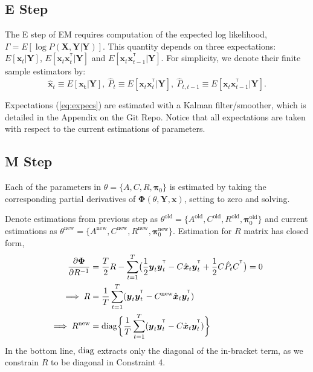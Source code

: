 \documentclass[fleqn,12pt]{article}
\let\oldref\ref
\renewcommand{\ref}[1]{(\oldref{#1})}
\newcommand{\T}{^{\ensuremath{\mathsf{T}}}}           %
\newcommand{\diag}{\operatornamewithlimits{diag}}
\providecommand{\mb}[1]{\boldsymbol{#1}}
\newcommand{\bx}{\mb{x}}
\newcommand{\by}{\mb{y}}
\newcommand{\bX}{\mb{X}}
\newcommand{\bY}{\mb{Y}}
\begin{document}
\subsection{E Step}
The E step of EM requires computation of the expected log likelihood, $\Gamma = E[\log P(\bX,\bY|\bY)]$. This quantity depends on three expectations: $E[\bx_t|\bY]$, $E[\bx_t\bx_t^{\T}|\bY]$ and $E[\bx_t\bx_{t-1}^{\T}|\bY]$. For simplicity, we denote their finite sample estimators by:
\begin{equation}\label{eq:expecs}
\hat{\bx}_t \equiv E[\mathbf{x_t}|\bY],\  \hat{P}_t  \equiv E[\bx_t\bx_t^{\T}|\bY],\  \hat{P}_{t,t-1}  \equiv E[\bx_t\bx_{t-1}^{\T}|\bY].
\end{equation}

Expectations \ref{eq:expecs} are estimated with a Kalman filter/smoother, which is detailed in the Appendix on the Git Repo. Notice that all expectations are taken with respect to the current estimations of parameters.
\subsection{M Step}
Each of the parameters in $\theta =\{A,C,R,\mathbf{\pi}_0\}$ is estimated by taking the corresponding partial derivatives of $\mathbf{\Phi}(\theta,\bY,\bx)$, setting to zero and solving.

Denote estimations from previous step as $\theta^{\text{old}} =\{A^{\text{old}},C^{\text{old}},R^{\text{old}},\mathbf{\pi}_0^{\text{old}}\}$ and current estimations as $\theta^{\text{new}} =\{A^{\text{new}},C^{\text{new}},R^{\text{new}},\mathbf{\pi}_0^{\text{new}}\}$. Estimation for $R$ matrix has closed form,
\begin{equation}\label{eq:updateR}
\begin{aligned}
\frac{\partial \mathbf{\Phi}}{\partial R^{-1}} &= \frac{T}{2}R - \sum\limits_{t=1}^T\bigl(\frac{1}{2}\by_t\by_t^{\T} - C\hat{\bx}_t\by_t^{\T}+\frac{1}{2}C\hat{P}_tC^{\T}\bigr) =0 \\
\implies R &= \frac{1}{T}\sum\limits_{t=1}^{T}(\by_t\by_t^{\T}-C^{\text{new}}\hat{\bx}_t\by_t^{\T})\\
\implies R^{\text{new}} &= \diag \biggl\{\frac{1}{T}\sum\limits_{t=1}^{T}(\by_t\by_t^{\T}-C\hat{\bx}_t\by_t^{\T})\biggr\}
\end{aligned}
\end{equation}
In the bottom line, $\diag$ extracts only the diagonal of the in-bracket term, as we constrain $R$ to be diagonal in Constraint 4.
\end{document}
